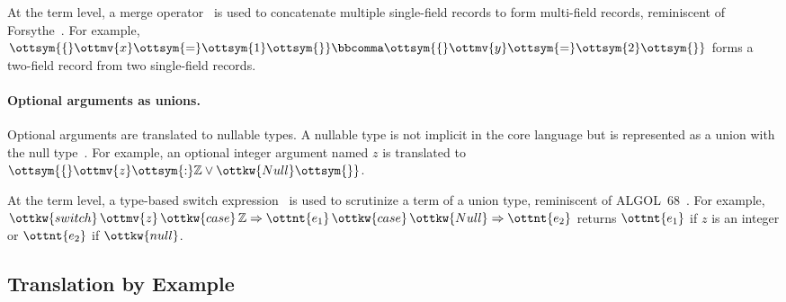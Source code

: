 At the term level, a merge
operator~\citep{dunfield2014elaborating,rehman2023blend} is used to concatenate
multiple single-field records to form multi-field records, reminiscent of
Forsythe~\citep{reynolds1997design}. For example, $\ottsym{\{}  \ottmv{x}  \ottsym{=}  \ottsym{1}  \ottsym{\}}  \bbcomma  \ottsym{\{}  \ottmv{y}  \ottsym{=}  \ottsym{2}  \ottsym{\}}$ forms a
two-field record from two single-field records.

\paragraph{Optional arguments as unions.}
Optional arguments are translated to nullable types. A nullable type is not
implicit in the core language but is represented as a union with the null
type~\citep{nieto2020scala}. For example, an optional integer argument named $z$
is translated to $\ottsym{\{}  \ottmv{z}  \ottsym{:}   \mathbb{Z}   \lor  \ottkw{Null}  \ottsym{\}}$.

At the term level, a type-based switch
expression~\citep{frisch2008semantic,rehman2023blend} is used to scrutinize a
term of a union type, reminiscent of ALGOL~68~\citep{van1975revised}. For
example, $\ottkw{switch} \, \ottmv{z} \, \ottkw{case} \,  \mathbb{Z}   \Rightarrow  \ottnt{e_{{\mathrm{1}}}} \, \ottkw{case} \, \ottkw{Null}  \Rightarrow  \ottnt{e_{{\mathrm{2}}}}$ returns $\ottnt{e_{{\mathrm{1}}}}$ if $z$
is an integer or $\ottnt{e_{{\mathrm{2}}}}$ if $\ottkw{null}$.

\subsection{Translation by Example} \label{sec:example}

